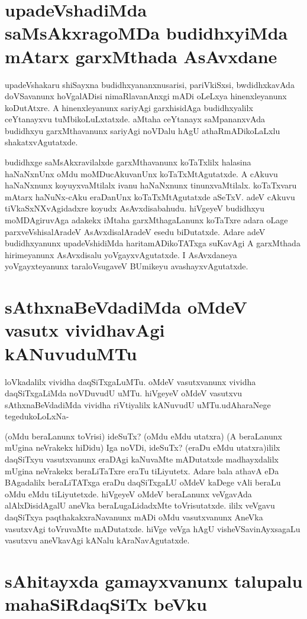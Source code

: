 \section*{upadeVshadiMda saMsAkxragoMDa budidhxyiMda mAtarx garxMthada AsAvxdane}

upadeVshakaru shiSayxna budidhxyananxnusarisi, pariVkiSxsi, bwdidhxkavAda doVSavanunx hoVgalADisi nimaRlavanAnxgi mADi oLeLxya hinenxleyanunx koDutAtxre. A hinenxleyanunx sariyAgi garxhisidAga budidhxyalilx ceYtanayxvu tuMbikoLuLxtatxde. aMtaha ceYtanayx saMpananxvAda budidhxyu garxMthavanunx sariyAgi noVDalu hAgU athaRmADikoLaLxlu shakatxvAgutatxde. 

budidhxge saMsAkxravilalxde garxMthavanunx koTaTxlilx halasina haNaNxnUnx oMdu moMDucAkuvanUnx koTaTxMtAgutatxde. A cAkuvu haNaNxnunx koyuyxvaMtilalx ivanu haNaNxnunx tinunxvaMtilalx. koTaTxvaru mAtarx haNuNx-cAku eraDanUnx koTaTxMtAgutatxde aSeTxV. adeV cAkuvu tiVkaSxNXvAgidadxre koyudx AsAvxdisabahudu. hiVgeyeV budidhxyu moMDAgiruvAga adakekx iMtaha garxMthagaLanunx koTaTxre adara oLage parxveVshisalAradeV AsAvxdisalAradeV esedu biDutatxde. Adare adeV budidhxyanunx upadeVshidiMda haritamADikoTATxga suKavAgi A garxMthada hirimeyanunx AsAvxdisalu yoVgayxvAgutatxde. I AsAvxdaneya yoVgayxteyanunx taraloVsugaveV BUmikeyu avashayxvAgutatxde.

\section*{sAthxnaBeVdadiMda oMdeV vasutx vividhavAgi kANuvuduMTu}

loVkadalilx vividha daqSiTxgaLuMTu. oMdeV vasutxvanunx vividha daqSiTxgaLiMda noVDuvudU uMTu. hiVgeyeV oMdeV vasutxvu sAthxnaBeVdadiMda vividha riVtiyalilx kANuvudU uMTu.udAharaNege tegedukoLoLxNa-

(oMdu beraLanunx toVrisi) ideSuTx? (oMdu eMdu utatxra) (A beraLanunx mUgina neVrakekx hiDidu) Iga noVDi, ideSuTx? (eraDu eMdu utatxra)ililx daqSiTxyu vasutxvanunx eraDAgi kaNuvaMte mADutatxde madhayxdalilx mUgina neVrakekx beraLiTaTxre eraTu tiLiyutetx. Adare bala athavA eDa BAgadalilx beraLiTATxga eraDu daqSiTxgaLU oMdeV kaDege vAli beraLu oMdu eMdu tiLiyutetxde. hiVgeyeV oMdeV beraLanunx veVgavAda alAlxDisidAgalU aneVka beraLugaLidadxMte toVrisutatxde. ililx veVgavu daqSiTxya paqthakakxraNavanunx mADi oMdu vasutxvanunx AneVka vasutxvAgi toVruvaMte mADutatxde. hiVge veVga hAgU visheVSavinAyxsagaLu vasutxvu aneVkavAgi kANalu kAraNavAgutatxde. 

\section*{sAhitayxda gamayxvanunx talupalu mahaSiRdaqSiTx beVku}


